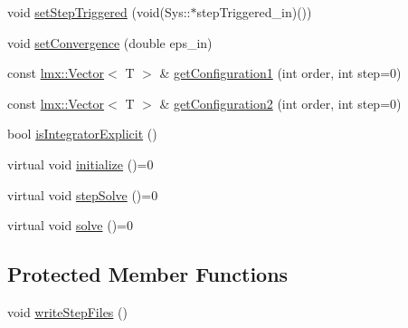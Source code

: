 \begin{DoxyCompactItemize}
\item 
void \hyperlink{classlmx_1_1DiffProblemDouble_ac3bfab9528535950de450453520a0f86}{set\-Step\-Triggered} (void(Sys\-::$\ast$step\-Triggered\-\_\-in)())
\item 
void \hyperlink{classlmx_1_1DiffProblemDouble_aab0427d12489cc988638ea87300eaf4e}{set\-Convergence} (double eps\-\_\-in)
\item 
const \hyperlink{classlmx_1_1Vector}{lmx\-::\-Vector}$<$ T $>$ \& \hyperlink{classlmx_1_1DiffProblemDouble_a4d9b7e2ecdd61a06ab6e7856b91d58fb}{get\-Configuration1} (int order, int step=0)
\item 
const \hyperlink{classlmx_1_1Vector}{lmx\-::\-Vector}$<$ T $>$ \& \hyperlink{classlmx_1_1DiffProblemDouble_aa5668ae04aaad91df040becbfe015142}{get\-Configuration2} (int order, int step=0)
\item 
bool \hyperlink{classlmx_1_1DiffProblemDouble_aae7c53702d881cf815429d9cdee40147}{is\-Integrator\-Explicit} ()
\item 
virtual void \hyperlink{classlmx_1_1DiffProblemDouble_a2f15d38c3ca50be92314584b99f5f31b}{initialize} ()=0
\item 
virtual void \hyperlink{classlmx_1_1DiffProblemDouble_a901247dbeb3ed310bc1c4a79359c8ba2}{step\-Solve} ()=0
\item 
virtual void \hyperlink{classlmx_1_1DiffProblemDouble_a9e0c8b706f755e2c142b1c031883307b}{solve} ()=0
\end{DoxyCompactItemize}
\subsection*{Protected Member Functions}
\begin{DoxyCompactItemize}
\item 
void \hyperlink{classlmx_1_1DiffProblemDouble_ab99b7e0b862abe5ba37719499dddbf55}{write\-Step\-Files} ()
\end{DoxyCompactItemize}
